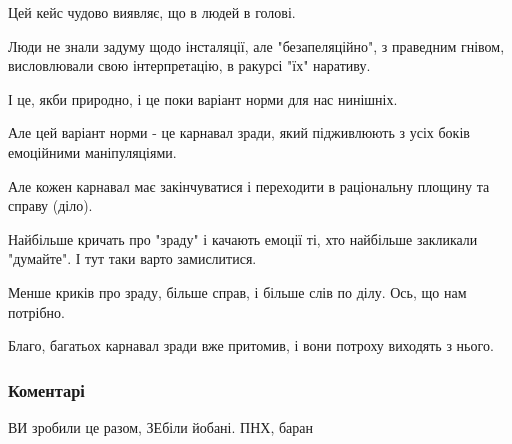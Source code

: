 Цей кейс чудово виявляє, що в людей в голові.

Люди не знали задуму щодо інсталяції, але "безапеляційно", з праведним гнівом,
висловлювали свою інтерпретацію, в ракурсі "їх" наративу.

І це, якби природно, і це поки варіант норми для нас нинішніх. 

Але цей варіант норми - це карнавал зради, який підживлюють з усіх боків
емоційними маніпуляціями.

Але кожен карнавал має закінчуватися і переходити в раціональну площину та
справу (діло).

Найбільше кричать про "зраду" і качають емоції ті, хто найбільше закликали
"думайте". І тут таки варто замислитися.

Менше криків про зраду, більше справ,  і більше слів по ділу. Ось, що нам
потрібно.

Благо, багатьох карнавал зради вже притомив, і вони потроху виходять з нього.

\subsubsection{Коментарі}
\begin{itemize}
 
ВИ зробили це разом, ЗЕбіли йобані. ПНХ, баран
\end{itemize}

